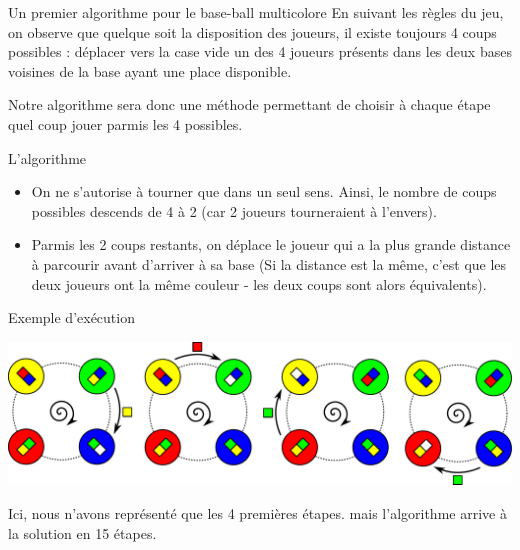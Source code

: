\begin{frame}{Un premier algorithme pour le base-ball multicolore}
  En suivant les règles du jeu, on observe que quelque soit la disposition des joueurs, il existe toujours 4 coups possibles : déplacer vers la case vide un des 4 joueurs présents dans les deux bases voisines de la base ayant une place disponible.

  Notre algorithme sera donc une méthode permettant de choisir à chaque étape quel coup jouer parmis les 4 possibles.

  \begin{block}{L'algorithme}
    \begin{itemize}
    \item On ne s'autorise à tourner que dans un seul sens. Ainsi, le nombre de coups possibles descends de 4 à 2 (car 2 joueurs tourneraient à l'envers).
    \item Parmis les 2 coups restants, on déplace le joueur qui a la plus grande distance à parcourir avant d'arriver à sa base (Si la distance est la même, c'est que les deux joueurs ont la même couleur - les deux coups sont alors équivalents).
    \end{itemize}
  \end{block}

  \begin{block}{Exemple d'exécution}
    \begin{center}
      \includegraphics[width=\linewidth]{img/baseball_ex1.pdf}
    \end{center}

  Ici, nous n'avons représenté que les 4 premières étapes. mais l'algorithme arrive à la solution en 15 étapes.
  \end{block}
\end{frame}

